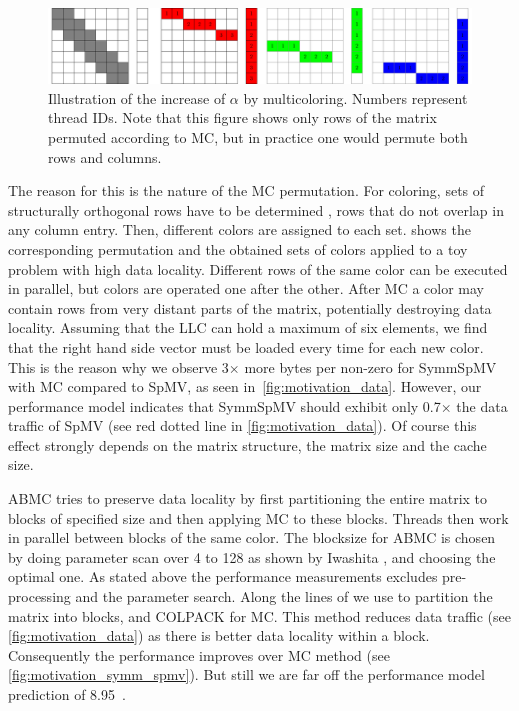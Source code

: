   \begin{figure}[tbp]
  	\centering
  	\includegraphics[scale=0.45]{pics/mc_alpha_problem/mc_alpha_unsymm}
  	\caption{Illustration of the increase of $\alpha$ by multicoloring. Numbers represent thread IDs. Note that this figure shows only rows of the matrix permuted according to \acrshort{MC}, but in practice one would permute both rows and columns.}
  	\label{fig:mc_alpha}
  \end{figure}
  
  The reason for this is the nature of the \acrlong{MC}  permutation. For \DTWO coloring, sets of structurally orthogonal rows have to be determined \cite{dist_k_def}, \ie rows that do not overlap in any column entry. Then, different colors are assigned to each set.  shows the corresponding permutation and the obtained sets of colors applied to a toy problem with high data locality. Different rows of the same color can be executed in parallel, but colors are operated one after the other. After \acrlong{MC} a color may contain rows from very distant parts of the matrix, potentially destroying data locality.  Assuming that the \acrfull{LLC} can hold a maximum of six elements, we find that the right hand side vector must be loaded every time for each new color. This is the reason why we observe 3$\times$ more bytes per non-zero for \acrshort{SymmSpMV} with \acrshort{MC} compared to \acrshort{SpMV}, as seen in~\cref{fig:motivation_data}.  However, our performance model indicates that \acrshort{SymmSpMV} should exhibit only 0.7$\times$ the data traffic of \acrshort{SpMV} (see red dotted line in \cref{fig:motivation_data}). Of course this effect strongly depends on the matrix structure, the matrix size and the cache size. 
      
  
 \acrfull{ABMC} tries to preserve data locality by first partitioning the entire matrix to blocks of specified size and then applying \acrlong{MC} to these blocks. Threads then work in parallel between blocks of the same color. The blocksize for \acrshort{ABMC} is chosen by doing parameter scan over 4 to 128 as shown by Iwashita \etal \cite{ABMC}, and choosing the optimal one. As stated above the performance measurements excludes pre-processing and the parameter search. Along the lines of \cite{Park_HPCG} we use \METIS \cite{METIS} to partition the matrix into blocks, and COLPACK for \acrlong{MC}.  This method reduces data traffic (see \cref{fig:motivation_data}) as there is better data locality within a block. Consequently the performance improves over \acrshort{MC} method (see \cref{fig:motivation_symm_spmv}). But still we are far off the performance model prediction of 8.95~\GF.
  
